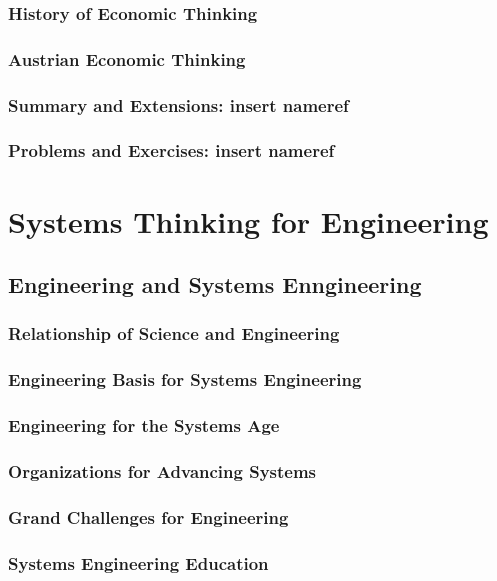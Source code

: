 \documentclass[11pt,fleqn]{book} %
\newcommand{\problems}[1]{} %
\begin{document}
    \section{History of Economic Thinking}
    \section{Austrian Economic Thinking}
    \section{Summary and Extensions: insert nameref}
    \section{Problems and Exercises: insert nameref}
       \problems{04}

\part{Systems Thinking for Engineering}

  \chapter{Engineering and Systems Enngineering}
    \section{Relationship of Science and Engineering}
    \section{Engineering Basis for Systems Engineering}
    \section{Engineering for the Systems Age}
    \section{Organizations for Advancing Systems}
    \section{Grand Challenges for Engineering}
    \section{Systems Engineering Education}
\end{document}
